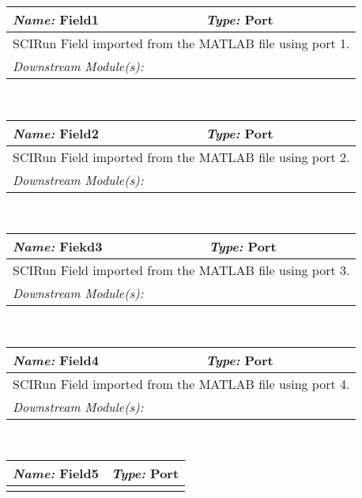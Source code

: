 \begin{centering}
\begin{tabular}{|p{6cm}|p{6cm}|} \hline
{\emph{Name:} Field1}&{\emph{Type:} Port}\\ \hline
\multicolumn{2}{|p{12cm}|}{

 SCIRun Field imported from the MATLAB file using port 1. 

}\\ \hline
\multicolumn{2}{|p{12cm}|}{\emph{Downstream Module(s):} }\\ \hline
\end{tabular} \\
\vspace{0.25cm}
\begin{tabular}{|p{6cm}|p{6cm}|} \hline
{\emph{Name:} Field2}&{\emph{Type:} Port}\\ \hline
\multicolumn{2}{|p{12cm}|}{

 SCIRun Field imported from the MATLAB file using port 2. 

}\\ \hline
\multicolumn{2}{|p{12cm}|}{\emph{Downstream Module(s):} }\\ \hline
\end{tabular} \\
\vspace{0.25cm}
\begin{tabular}{|p{6cm}|p{6cm}|} \hline
{\emph{Name:} Fiekd3}&{\emph{Type:} Port}\\ \hline
\multicolumn{2}{|p{12cm}|}{

 SCIRun Field imported from the MATLAB file using port 3. 

}\\ \hline
\multicolumn{2}{|p{12cm}|}{\emph{Downstream Module(s):} }\\ \hline
\end{tabular} \\
\vspace{0.25cm}
\begin{tabular}{|p{6cm}|p{6cm}|} \hline
{\emph{Name:} Field4}&{\emph{Type:} Port}\\ \hline
\multicolumn{2}{|p{12cm}|}{

 SCIRun Field imported from the MATLAB file using port 4. 

}\\ \hline
\multicolumn{2}{|p{12cm}|}{\emph{Downstream Module(s):} }\\ \hline
\end{tabular} \\
\vspace{0.25cm}
\begin{tabular}{|p{6cm}|p{6cm}|} \hline
{\emph{Name:} Field5}&{\emph{Type:} Port}\\ \hline
\multicolumn{2}{|p{12cm}|}{

}
\end{tabular}
\end{centering}
